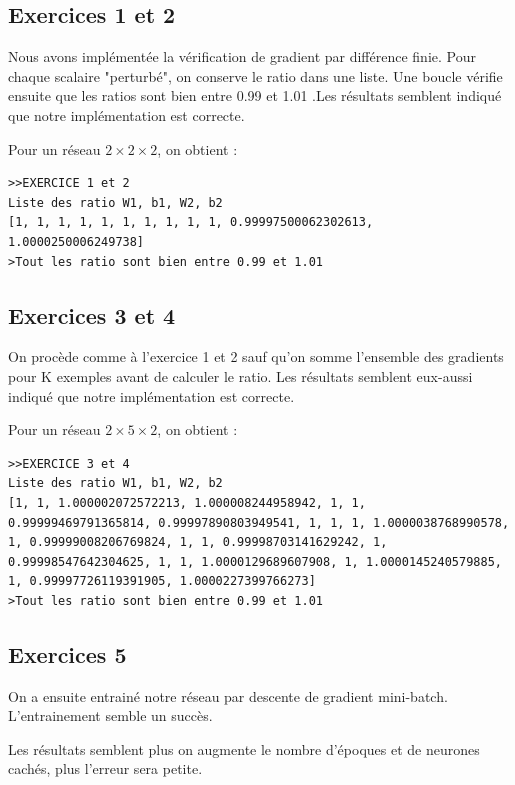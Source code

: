 \documentclass[a4paper,11pt]{article}
\begin{document}
\subsection{Exercices 1 et 2}

Nous avons implémentée la vérification de gradient par différence finie. Pour chaque scalaire "perturbé", on conserve le ratio dans une liste. Une boucle vérifie ensuite que les ratios sont bien entre 0.99 et 1.01 .Les résultats semblent indiqué que notre implémentation est correcte.

Pour un réseau $ 2 \times 2 \times 2 $, on obtient :
\begin{verbatim}
>>EXERCICE 1 et 2
Liste des ratio W1, b1, W2, b2
[1, 1, 1, 1, 1, 1, 1, 1, 1, 1, 0.99997500062302613, 1.0000250006249738]
>Tout les ratio sont bien entre 0.99 et 1.01
\end{verbatim}


\subsection{Exercices 3 et 4	}

On procède comme à l'exercice 1 et 2 sauf qu'on somme l'ensemble des gradients pour K exemples avant de calculer le ratio. Les résultats semblent eux-aussi indiqué que notre implémentation est correcte.

Pour un réseau $ 2 \times 5 \times 2 $, on obtient :
\begin{verbatim}
>>EXERCICE 3 et 4
Liste des ratio W1, b1, W2, b2
[1, 1, 1.000002072572213, 1.000008244958942, 1, 1, 0.99999469791365814, 0.99997890803949541, 1, 1, 1, 1.0000038768990578, 1, 0.99999008206769824, 1, 1, 0.99998703141629242, 1, 0.99998547642304625, 1, 1, 1.0000129689607908, 1, 1.0000145240579885, 1, 0.99997726119391905, 1.0000227399766273]
>Tout les ratio sont bien entre 0.99 et 1.01
\end{verbatim}

\subsection{Exercices 5}

On a ensuite entrainé notre réseau par descente de gradient mini-batch.
L'entrainement semble un succès.

Les résultats semblent plus on augmente le nombre d'époques et de neurones cachés, plus l'erreur sera petite.
\end{document}
